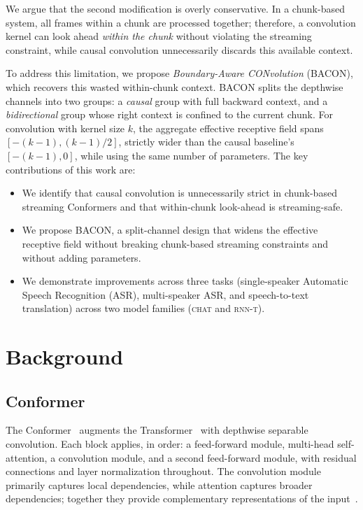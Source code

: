 \documentclass[cameraready]{Interspeech}
\begin{document}
We argue that the second modification is overly conservative. 
In a chunk-based system, all frames within a chunk are processed together; therefore, a
convolution kernel can look ahead \emph{within the chunk} without violating the
streaming constraint, while causal convolution unnecessarily discards this
available context.



To address this limitation, we propose \emph{Boundary-Aware CONvolution} (BACON), which recovers this wasted within-chunk context. 
BACON splits the depthwise channels into two groups: a \emph{causal} group with full backward context, and a \emph{bidirectional} group whose right context is confined to the current
chunk. 
For convolution with kernel size $k$, the aggregate effective receptive field spans $[-(k-1), (k-1)/2]$, strictly wider than the causal baseline's $[-(k-1), 0]$,
while using the same number of parameters.
The key contributions of this work are:
\begin{itemize}
    \item We identify that causal convolution is unnecessarily strict in
          chunk-based streaming Conformers and that within-chunk look-ahead is
          streaming-safe.
    \item We propose BACON, a split-channel design that widens the effective
          receptive field without breaking chunk-based streaming constraints
          and without adding parameters.
    \item We demonstrate improvements across three tasks
          (single-speaker Automatic Speech Recognition (ASR), multi-speaker ASR, and speech-to-text translation) across two
          model families (\textsc{chat} and \textsc{rnn-t}).
\end{itemize}

\section{Background}
\label{sec:background}

\subsection{Conformer}
\label{subsec:conformer}

The Conformer~\cite{gulati2020conformer} augments the
Transformer~\cite{vaswani2017attention} with depthwise separable convolution.
Each block applies, in order: a feed-forward module, multi-head self-attention,
a convolution module, and a second feed-forward module, with residual
connections and layer normalization throughout. 
The convolution module primarily captures local dependencies, while attention captures broader
dependencies; together they provide complementary representations of the
input~\cite{gulati2020conformer,mohamed2019transformers}.
\end{document}
